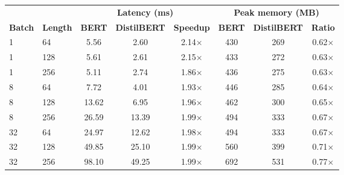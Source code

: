 \begin{tabular}{llcccccc}
\toprule
\rowcolor{cabecera} &  & \multicolumn{3}{c}{\textbf{Latency (ms)}} & \multicolumn{3}{c}{\textbf{Peak memory (MB)}} \\
\cmidrule(lr){3-5}\cmidrule(lr){6-8}
\rowcolor{cabecera}\textbf{Batch} & \textbf{Length} & \textbf{BERT} & \textbf{DistilBERT} & \textbf{Speedup} & \textbf{BERT} & \textbf{DistilBERT} & \textbf{Ratio} \\
\midrule
1 & 64 & 5.56 & 2.60 & 2.14$\times$ & 430 & 269 & 0.62$\times$ \\
1 & 128 & 5.61 & 2.61 & 2.15$\times$ & 433 & 272 & 0.63$\times$ \\
1 & 256 & 5.11 & 2.74 & 1.86$\times$ & 436 & 275 & 0.63$\times$ \\
\midrule
8 & 64 & 7.72 & 4.01 & 1.93$\times$ & 446 & 285 & 0.64$\times$ \\
8 & 128 & 13.62 & 6.95 & 1.96$\times$ & 462 & 300 & 0.65$\times$ \\
8 & 256 & 26.59 & 13.39 & 1.99$\times$ & 494 & 333 & 0.67$\times$ \\
\midrule
32 & 64 & 24.97 & 12.62 & 1.98$\times$ & 494 & 333 & 0.67$\times$ \\
32 & 128 & 49.85 & 25.10 & 1.99$\times$ & 560 & 399 & 0.71$\times$ \\
32 & 256 & 98.10 & 49.25 & 1.99$\times$ & 692 & 531 & 0.77$\times$ \\
\bottomrule
\end{tabular}
